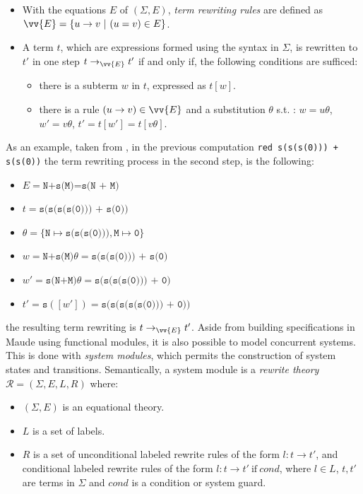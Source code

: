 \begin{itemize}
    \item With the equations $E$ of $(\Sigma, E)$, \textit{term rewriting rules} are defined as $\vv{E} = \{u \rightarrow v  \ | \ (u = v) \in E \}$. 
    \item A term $t$, which are expressions formed using the syntax in $\Sigma$, is rewritten to $t'$ in one step $t \rightarrow_{\vv{E}} t'$ if and only if, the following conditions are sufficed:
        \begin{itemize}
            \item there is a subterm $w$ in $t$, expressed as $t[w]$.
            \item there is a rule $(u \rightarrow v) \in \vv{E}$ and a substitution $\theta$ s.t. : $w = u\theta$, $w' = v\theta$, $t'=t[w']=t[v\theta]$.   
        \end{itemize}
\end{itemize}
As an example, taken from \cite{Lecture1}, in the previous computation \texttt{red s(s(s(0))) + s(s(0))} the term rewriting process in the second step, is the following:
\begin{itemize}
    \item $E = \texttt{N+s(M)=s(N + M)}$
    \item $t = \texttt{s(s(s(s(0))) + s(0))}$
    \item $\theta = \{\texttt{N} \mapsto \texttt{s(s(s(0)))},\texttt{M} \mapsto \texttt{0} \}$
    \item $w = \texttt{N+s(M)}\theta = \texttt{s(s(s(0))) + s(0)}$
    \item $w' = \texttt{s(N+M)}\theta = \texttt{s(s(s(s(0))) + 0)}$
    \item $t' = \texttt{s}([w']) = \texttt{s(s(s(s(s(0))) + 0))}$
\end{itemize}
the resulting term rewriting is $t \rightarrow_{\vv{E}} t'$.
Aside from building specifications in Maude using functional modules, it is also possible to model concurrent systems. This is done with \textit{system modules}, which permits the construction of system states and transitions. Semantically, a system module is a \textit{rewrite theory} \cite{PeterMaude,Lecture3} $\mathscr{R} = (\Sigma, E, L, R)$ where: 
\begin{itemize}
    \item $(\Sigma, E)$ is an equational theory.
    \item $L$ is a set of labels.
    \item $R$ is a set of unconditional labeled rewrite rules of the form $l: t \rightarrow t'$, and conditional labeled rewrite rules of the form $l: t \rightarrow t' \ \text{if} \ cond$, where $l \in L$, $t,t'$ are terms in $\Sigma$ and $cond$ is a condition or system guard.    
\end{itemize}
